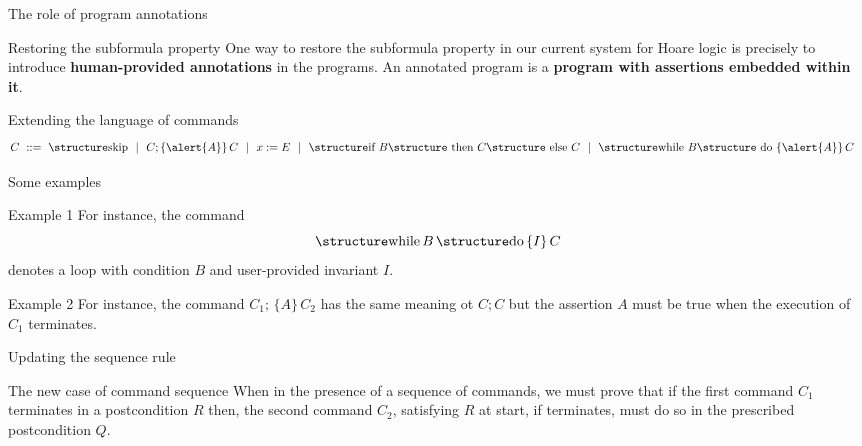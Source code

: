\documentclass[aspectratio=169]{beamer}
\begin{document}
\begin{slide}{The role of program annotations}
\begin{block}{Restoring the subformula property}  
  One way to restore the subformula property in our current system for Hoare logic is precisely to introduce \textbf{human-provided annotations} in the programs. An annotated program is a \textbf{program with assertions embedded within it}.  
\end{block}
\begin{block}{Extending the language of commands}
\begin{align*}
  C &~::=~ \kw {skip} ~~|~~ C;\{\alert{A}\}\,C ~~|~~ x:=E
 ~~|~~  \kw{if } B \kw{ then } C\kw{ else }C ~~|~~  \kw{while }B\kw{ do }\{\alert{A}\}\,C
\end{align*}  
\end{block}
\end{slide}

\begin{slide}{Some examples}
\begin{block}{Example 1}
For instance, the command $$\kw{while}\,B\,\kw{do}\,\{I\}\,C$$ denotes a loop with condition $B$ and user-provided invariant $I$.  
\end{block}
\begin{block}{Example 2}
For instance, the command $C_1;\,\{A\}\,C_2$ has the same meaning ot $C;C$ but the assertion $A$ must be true when the execution of $C_1$ terminates.
\end{block}
\end{slide}


\begin{frame}[fragile]{Updating the sequence rule}
  \begin{block}{The new case of command sequence}
  When in the presence of a sequence of commands, we must prove that if the first command $C_1$ terminates in a postcondition $R$ then, the second command $C_2$, satisfying $R$ at start, if terminates, must do so in the prescribed postcondition $Q$.
    \begin{prooftree}
    \end{prooftree}
  \end{block}
\end{frame}
\end{document}
